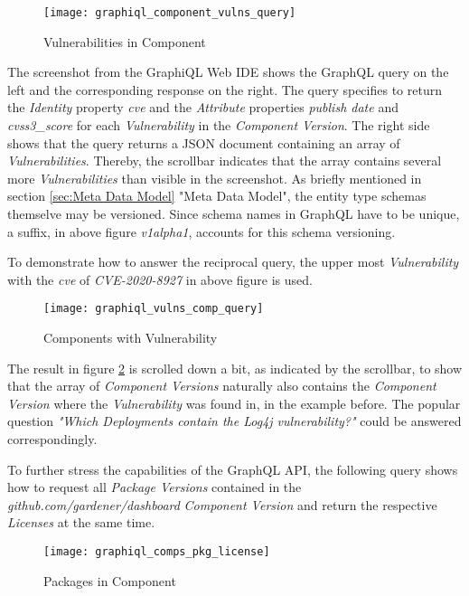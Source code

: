 \begin{figure}[H]
	\centering
	\texttt{[image: graphiql\_component\_vulns\_query]}
	\caption[GraphQL Query Vulnerabilities in Component]{Vulnerabilities in Component }
	\label{fig:VulnsInComp}
\end{figure}

The screenshot from the GraphiQL Web IDE shows the GraphQL query on the left and the corresponding response on the right. The query specifies to return the \emph{Identity} property \emph{cve} and the \emph{Attribute} properties \emph{publish date} and \emph{cvss3\_score} for each \emph{Vulnerability} in the \emph{Component Version}. The right side shows that the query returns a JSON document containing an array of \emph{Vulnerabilities}. Thereby, the scrollbar indicates that the array contains several more \emph{Vulnerabilities} than visible in the screenshot. As briefly mentioned in section \ref{sec:Meta Data Model} "Meta Data Model", the entity type schemas themselve may be versioned. Since schema names in GraphQL have to be unique, a suffix, in above figure \emph{v1alpha1}, accounts for this schema versioning.\par 
To demonstrate how to answer the reciprocal query, the upper most \emph{Vulnerability} with the \emph{cve} of \emph{CVE-2020-8927} in above figure is used. 

\begin{figure}[H]
	\centering
	\texttt{[image: graphiql\_vulns\_comp\_query]}
	\caption[GraphQL Query Components with Vulnerability]{Components with Vulnerability }
	\label{fig:CompsWithVuln}
\end{figure}

The result in figure \ref{fig:CompsWithVuln} is scrolled down a bit, as indicated by the scrollbar, to show that the array of \emph{Component Versions} naturally also contains the \emph{Component Version} where the \emph{Vulnerability} was found in, in the example before. The popular question \emph{"Which Deployments contain the Log4j vulnerability?"} could be answered correspondingly.\par
To further stress the capabilities of the GraphQL API, the following query shows how to request all \emph{Package Versions} contained in the \emph{github.com/gardener/dashboard} \emph{Component Version} and return the respective \emph{Licenses} at the same time.

\begin{figure}[H]
	\centering
	\texttt{[image: graphiql\_comps\_pkg\_license]}
	\caption[GraphQL Query Packages in Component]{Packages in Component }
	\label{fig:CompWithPkgs}
\end{figure}

